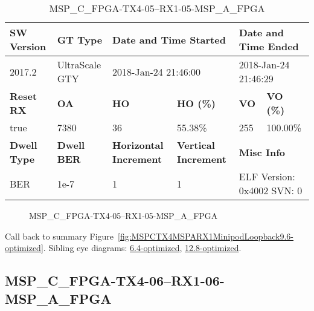 \begin{table}[h]
\centering
\caption{MSP\_C\_FPGA-TX4-05--RX1-05-MSP\_A\_FPGA}
\label{tab:MSPCFPGATX405RX105MSPAFPGA9.6-optimized}
\begin{tabular}{@{}|l|l|l|l|l|l|@{}}
\toprule
\textbf{SW Version}                & \textbf{GT Type}   & \multicolumn{2}{l|}{\textbf{Date and Time Started}}            & \multicolumn{2}{l|}{\textbf{Date and Time Ended}}        \\ \midrule
2017.2                       & UltraScale GTY          & \multicolumn{2}{l|}{2018-Jan-24 21:46:00}                   & \multicolumn{2}{l|}{2018-Jan-24 21:46:29}               \\ \midrule
\textbf{Reset RX}                  & \textbf{OA} & \textbf{HO}   & \textbf{HO (\%)} & \textbf{VO} & \textbf{VO (\%)} \\ \midrule
true & 7380        & 36          & 55.38\%        & 255        & 100.00\%       \\ \midrule
\textbf{Dwell Type}                & \textbf{Dwell BER} & \textbf{Horizontal Increment} & \textbf{Vertical Increment}    & \multicolumn{2}{l|}{\textbf{Misc Info}}                  \\ \midrule
BER                            & 1e-7        & 1        & 1           & \multicolumn{2}{l|}{ELF Version: 0x4002 SVN: 0}                         \\ \bottomrule
\end{tabular}
\end{table}

\begin{figure}[h]
\caption{MSP\_C\_FPGA-TX4-05--RX1-05-MSP\_A\_FPGA} \label{fig:MSPCFPGATX405RX105MSPAFPGA9.6-optimized}
\end{figure}

Call back to summary Figure~\ref{fig:MSPCTX4MSPARX1MinipodLoopback9.6-optimized}.
Sibling eye diagrams: \hyperref[sec:MSPCFPGATX405RX105MSPAFPGA6.4-optimized]{6.4-optimized}, \hyperref[sec:MSPCFPGATX405RX105MSPAFPGA12.8-optimized]{12.8-optimized}.

\clearpage
\newpage


\subsection{MSP\_C\_FPGA-TX4-06--RX1-06-MSP\_A\_FPGA}\label{sec:MSPCFPGATX406RX106MSPAFPGA9.6-optimized}

